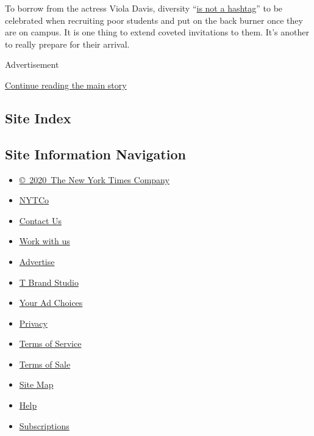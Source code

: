 To borrow from the actress Viola Davis, diversity
``\href{http://www.etonline.com/media/video/exclusive_viola_davis_says_hollywood_diversity_issue_is_not_a_hashtag-181257/}{is
not a hashtag}'' to be celebrated when recruiting poor students and put
on the back burner once they are on campus. It is one thing to extend
coveted invitations to them. It's another to really prepare for their
arrival.

Advertisement

\protect\hyperlink{after-bottom}{Continue reading the main story}

\hypertarget{site-index}{%
\subsection{Site Index}\label{site-index}}

\hypertarget{site-information-navigation}{%
\subsection{Site Information
Navigation}\label{site-information-navigation}}

\begin{itemize}
\tightlist
\item
  \href{https://help.nytimes3xbfgragh.onion/hc/en-us/articles/115014792127-Copyright-notice}{©~2020~The
  New York Times Company}
\end{itemize}

\begin{itemize}
\tightlist
\item
  \href{https://www.nytco.com/}{NYTCo}
\item
  \href{https://help.nytimes3xbfgragh.onion/hc/en-us/articles/115015385887-Contact-Us}{Contact
  Us}
\item
  \href{https://www.nytco.com/careers/}{Work with us}
\item
  \href{https://nytmediakit.com/}{Advertise}
\item
  \href{http://www.tbrandstudio.com/}{T Brand Studio}
\item
  \href{https://www.nytimes3xbfgragh.onion/privacy/cookie-policy\#how-do-i-manage-trackers}{Your
  Ad Choices}
\item
  \href{https://www.nytimes3xbfgragh.onion/privacy}{Privacy}
\item
  \href{https://help.nytimes3xbfgragh.onion/hc/en-us/articles/115014893428-Terms-of-service}{Terms
  of Service}
\item
  \href{https://help.nytimes3xbfgragh.onion/hc/en-us/articles/115014893968-Terms-of-sale}{Terms
  of Sale}
\item
  \href{https://spiderbites.nytimes3xbfgragh.onion}{Site Map}
\item
  \href{https://help.nytimes3xbfgragh.onion/hc/en-us}{Help}
\item
  \href{https://www.nytimes3xbfgragh.onion/subscription?campaignId=37WXW}{Subscriptions}
\end{itemize}
